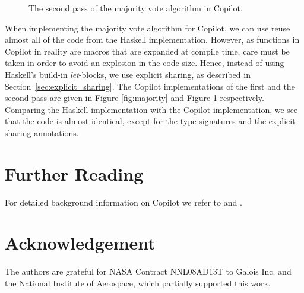 \documentclass[]{article}
\theoremstyle{example}
\begin{document}
\begin{figure}[ht]
\caption{The second pass of the majority vote algorithm in Copilot.}
\label{fig:amajority}
\end{figure}

When implementing the majority vote algorithm for Copilot, we can use reuse
almost all of the code from the Haskell implementation. However, as functions
in Copilot in reality are macros that are expanded at compile time, care must
be taken in order to avoid an explosion in the code size. Hence, instead of
using Haskell's build-in \emph{let}-blocks, we use explicit sharing, as
described in Section~\ref{sec:explicit_sharing}. The Copilot implementations
of the first and the second pass are given in Figure \ref{fig:majority} and
Figure \ref{fig:amajority} respectively. Comparing the Haskell implementation
with the Copilot implementation, we see that the code is almost identical,
except for the type signatures and the explicit sharing annotations.




\section*{Further Reading}

For detailed background information on Copilot we refer to \cite{PikeGoodloe2010} and \cite{PikeGoodloe2011}.

\section*{Acknowledgement}

The authors are grateful for NASA Contract NNL08AD13T to Galois Inc. and the
National Institute of Aerospace, which partially supported this work.

{


}
\end{document}
